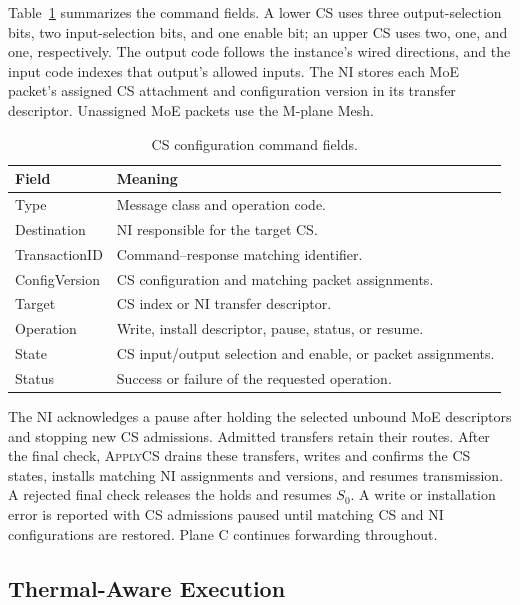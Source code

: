 \documentclass[conference,10pt]{IEEEtran}
\begin{document}
Table~\ref{tab:noc-command-fields} summarizes the command fields.
A lower CS uses three output-selection bits, two input-selection bits,
and one enable bit; an upper CS uses two, one, and one, respectively.
The output code follows the instance's wired directions, and the input
code indexes that output's allowed inputs. The NI stores each MoE
packet's assigned CS attachment and configuration version in its
transfer descriptor. Unassigned MoE packets use the M-plane Mesh.

\begin{table}[!t]
  \caption{CS configuration command fields.}
  \label{tab:noc-command-fields}
  \centering\small
  \begin{tabularx}{\columnwidth}{@{}p{}>{\raggedright\arraybackslash}X@{}}
    \hline
    Field & Meaning \\
    \hline
    Type & Message class and operation code. \\
    Destination & NI responsible for the target CS. \\
    TransactionID & Command--response matching identifier. \\
    ConfigVersion & CS configuration and matching packet assignments. \\
    Target & CS index or NI transfer descriptor. \\
    Operation & Write, install descriptor, pause, status, or resume. \\
    State & CS input/output selection and enable, or packet assignments. \\
    Status & Success or failure of the requested operation. \\
    \hline
  \end{tabularx}
\end{table}

The NI acknowledges a pause after holding the selected unbound MoE
descriptors and stopping new CS admissions. Admitted transfers retain
their routes. After the final check, \textsc{ApplyCS} drains these
transfers, writes and confirms the CS states, installs matching NI
assignments and versions, and resumes transmission. A rejected final check
releases the holds and resumes $S_0$. A write or installation error
is reported with CS admissions paused until matching CS and NI
configurations are restored. Plane C continues forwarding throughout.

\subsection{Thermal-Aware Execution}
\label{sec:thermal-design}
\end{document}
